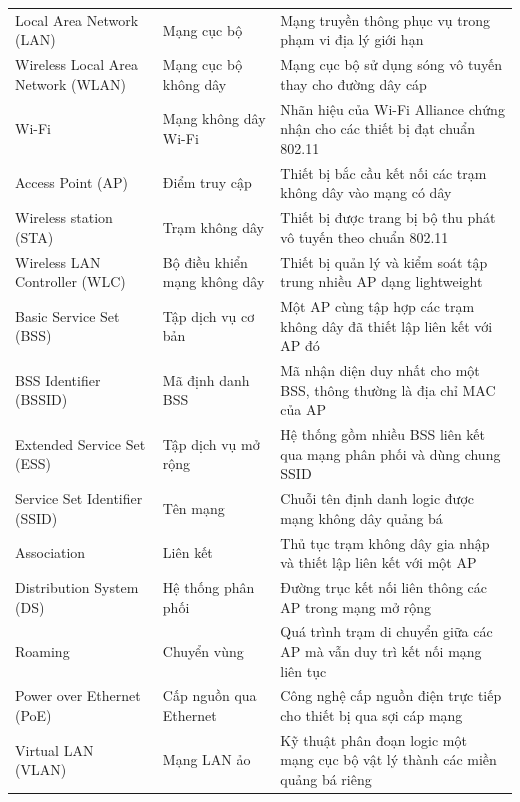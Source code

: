 \begin{xltabular}{\linewidth}{@{} L{0.8} L{0.8} L{1.4} @{}}
  Local Area Network (LAN) & Mạng cục bộ & Mạng truyền thông phục vụ trong phạm vi địa lý giới hạn\\
  Wireless Local Area Network (WLAN) & Mạng cục bộ không dây & Mạng cục bộ sử dụng sóng vô tuyến thay cho đường dây cáp\\
  Wi-Fi & Mạng không dây Wi-Fi & Nhãn hiệu của Wi-Fi Alliance chứng nhận cho các thiết bị đạt chuẩn 802.11\\
  Access Point (AP) & Điểm truy cập & Thiết bị bắc cầu kết nối các trạm không dây vào mạng có dây\\
  Wireless station (STA) & Trạm không dây & Thiết bị được trang bị bộ thu phát vô tuyến theo chuẩn 802.11\\
  Wireless LAN Controller (WLC) & Bộ điều khiển mạng không dây & Thiết bị quản lý và kiểm soát tập trung nhiều AP dạng lightweight\\
  Basic Service Set (BSS) & Tập dịch vụ cơ bản & Một AP cùng tập hợp các trạm không dây đã thiết lập liên kết với AP đó\\
  BSS Identifier (BSSID) & Mã định danh BSS & Mã nhận diện duy nhất cho một BSS, thông thường là địa chỉ MAC của AP\\
  Extended Service Set (ESS) & Tập dịch vụ mở rộng & Hệ thống gồm nhiều BSS liên kết qua mạng phân phối và dùng chung SSID\\
  Service Set Identifier (SSID) & Tên mạng & Chuỗi tên định danh logic được mạng không dây quảng bá\\
  Association & Liên kết & Thủ tục trạm không dây gia nhập và thiết lập liên kết với một AP\\
  Distribution System (DS) & Hệ thống phân phối & Đường trục kết nối liên thông các AP trong mạng mở rộng\\
  Roaming & Chuyển vùng & Quá trình trạm di chuyển giữa các AP mà vẫn duy trì kết nối mạng liên tục\\
  Power over Ethernet (PoE) & Cấp nguồn qua Ethernet & Công nghệ cấp nguồn điện trực tiếp cho thiết bị qua sợi cáp mạng\\
  Virtual LAN (VLAN) & Mạng LAN ảo & Kỹ thuật phân đoạn logic một mạng cục bộ vật lý thành các miền quảng bá riêng\\


\end{xltabular}
